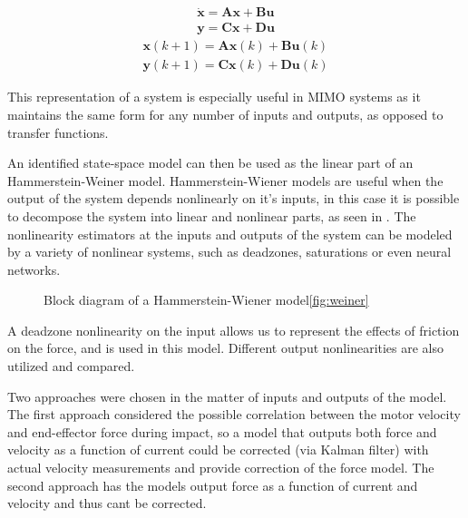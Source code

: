 \begin{align}\label{eq:ssc}
\dot{\mathbf{x}} = \mathbf{A}\mathbf{x} + \mathbf{B}\mathbf{u} \\
\mathbf{y} = \mathbf{C}\mathbf{x} + \mathbf{D}\mathbf{u}
\end{align}
\vspace{-0.5cm}
\begin{align}\label{eq:ssd}
\mathbf{x}(k+1) = \mathbf{A}\mathbf{x}(k) + \mathbf{B}\mathbf{u}(k)\\
\mathbf{y}(k+1) = \mathbf{C}\mathbf{x}(k) + \mathbf{D}\mathbf{u}(k)
\end{align}

This representation of a system is especially useful in MIMO systems as it maintains the same form for any number of inputs and outputs, as opposed to transfer functions.

An identified state-space model can then be used as the linear part of an Hammerstein-Weiner model.
Hammerstein-Wiener models are useful when the output of the system depends nonlinearly on it's inputs, in this case it is possible to decompose the system into linear and nonlinear parts, as seen in . 
The nonlinearity estimators at the inputs and outputs of the system can be modeled by a variety of nonlinear systems, such as deadzones, saturations or even neural networks.

\begin{figure} 
\caption{Block diagram of a Hammerstein-Wiener model\ref{fig:weiner}}
\label{weiner}
\end{figure}

A deadzone nonlinearity on the input allows us to represent the effects of friction on the force, and is used in this model.
Different output nonlinearities are also utilized and compared.

Two approaches were chosen in the matter of inputs and outputs of the model.
The first approach considered the possible correlation between the motor velocity and end-effector force during impact, so a model that outputs both force and velocity as a function of current could be corrected (via Kalman filter) with actual velocity measurements and provide correction of the force model.
The second approach has the models output force as a function of current and velocity and thus cant be corrected.

